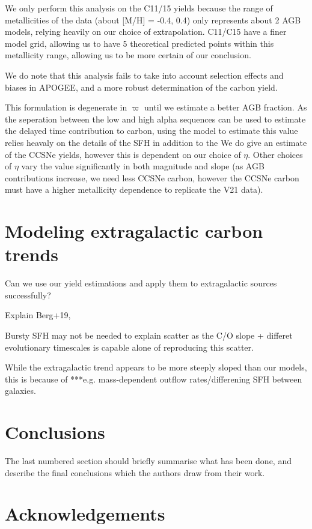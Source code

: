 \documentclass[fleqn,usenatbib]{mnras}
\begin{document}
We only perform this analysis on the C11/15 yields because the range of metallicities of the data (about [M/H] = -0.4, 0.4) only represents about 2 AGB models, relying heavily on our choice of extrapolation. C11/C15 have a finer model grid, allowing us to have 5 theoretical predicted points within this metallicity range, allowing us to be more certain of our conclusion. 

We do note that this analysis fails to take into account selection effects and biases in APOGEE, and a more robust determination of the carbon yield. 


This formulation is degenerate in $\varpi$ until we estimate a better AGB fraction. As the seperation between the low and high alpha sequences can be used to estimate the delayed time contribution to carbon, using the model to estimate this value relies heavaly on the details of the SFH in addition to the 
We do give an estimate of the CCSNe yields, however this is dependent on our choice of $\eta$. Other choices of $\eta$ vary the value significantly in both magnitude and slope (as AGB contributions increase, we need less CCSNe carbon, however the CCSNe carbon must have a higher metallicity dependence to replicate the V21 data). 


\section{Modeling extragalactic carbon trends}
Can we use our yield estimations and apply them to extragalactic sources successfully? 

Explain Berg+19,

Bursty SFH may not be needed to explain scatter as the C/O slope + differet evolutionary timescales is capable alone of reproducing this scatter.

While the extragalactic trend appears to be more steeply sloped than our models, this is because of ***e.g. mass-dependent outflow rates/differening SFH between galaxies. 


\section{Conclusions}

The last numbered section should briefly summarise what has been done, and describe
the final conclusions which the authors draw from their work.

\section*{Acknowledgements}
\end{document}
